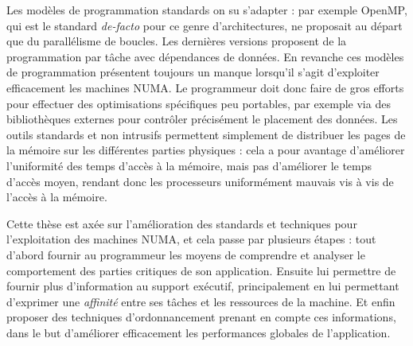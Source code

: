Les modèles de programmation standards on su s'adapter : par exemple OpenMP, qui est le standard \emph{de-facto} pour ce genre d'architectures, ne proposait au départ que du parallélisme de boucles. Les dernières versions proposent de la programmation par tâche avec dépendances de données.
En revanche ces modèles de programmation présentent toujours un manque lorsqu'il s'agit d'exploiter efficacement les machines NUMA.
Le programmeur doit donc faire de gros efforts pour effectuer des optimisations spécifiques peu portables, par exemple via des bibliothèques externes pour contrôler précisément le placement des données.
Les outils standards et non intrusifs permettent simplement de distribuer les pages de la mémoire sur les différentes parties physiques : cela a pour avantage d'améliorer l'uniformité des temps d'accès à la mémoire, mais pas d'améliorer le temps d'accès moyen, rendant donc les processeurs uniformément mauvais vis à vis de l'accès à la mémoire.

Cette thèse est axée sur l'amélioration des standards et techniques pour l'exploitation des machines NUMA, et cela passe par plusieurs étapes : tout d'abord fournir au programmeur les moyens de comprendre et analyser le comportement des parties critiques de son application.
Ensuite lui permettre de fournir plus d'information au support exécutif, principalement en lui permettant d'exprimer une \emph{affinité} entre ses tâches et les ressources de la machine.
Et enfin proposer des techniques d'ordonnancement prenant en compte ces informations, dans le but d'améliorer efficacement les performances globales de l'application.







